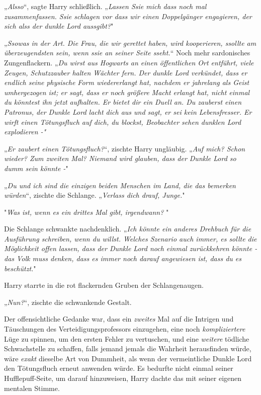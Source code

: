 {„\emph{Alsso}“, sagte Harry schließlich. „\emph{Lassen Ssie mich dass noch mal zusammenfassen. Ssie schlagen vor dass wir einen Doppelgänger engagieren, der sich alss der dunkle Lord aussgibt?}"

„\emph{Ssowas in der Art. Die Frau, die wir gerettet haben, wird kooperieren, ssollte am überzeugendsten sein, wenn ssie an seiner Seite sseht.}“ Noch mehr sardonisches Zungenflackern. „\emph{Du wirst aus Hogwarts an einen öffentlichen Ort entführt, viele Zeugen, Schutzzauber halten Wächter fern. Der dunkle Lord verkündet, dass er endlich seine physische Form wiedererlangt hat, nachdem er jahrelang als Geist umhergezogen ist; er sagt, dass er noch größere Macht erlangt hat, nicht einmal du könntest ihn jetzt aufhalten. Er bietet dir ein Duell an. Du zauberst einen Patronus, der Dunkle Lord lacht dich aus und sagt, er sei kein Lebensfresser. Er wirft einen Tötungsfluch auf dich, du blockst, Beobachter sehen dunklen Lord explodieren -"}

„\emph{Er zaubert einen Tötungsfluch?}“, zischte Harry ungläubig. „\emph{Auf mich? Schon wieder? Zum zweiten Mal? Niemand wird glauben, dass der Dunkle Lord so dumm sein könnte -}"

„\emph{Du und ich sind die einzigen beiden Menschen im Land, die das bemerken würden}“, zischte die Schlange. „\emph{Verlass dich drauf, Junge.}"

"\emph{Was ist, wenn es ein drittes Mal gibt, irgendwann?} "

Die Schlange schwankte nachdenklich. „\emph{Ich könnte ein anderes Drehbuch für die Ausführung schreiben, wenn du willst. Welches Szenario auch immer, es sollte die Möglichkeit offen lassen, dass der Dunkle Lord noch einmal zurückkehren könnte - das Volk muss denken, dass es immer noch darauf angewiesen ist, dass du es beschützt.}"

Harry starrte in die rot flackernden Gruben der Schlangenaugen.

„\emph{Nun?}“, zischte die schwankende Gestalt.

Der offensichtliche Gedanke war, dass ein \emph{zweites} Mal auf die Intrigen und Täuschungen des Verteidigungsprofessors einzugehen, eine noch \emph{kompliziertere} Lüge zu spinnen, um den ersten Fehler zu vertuschen, und eine \emph{weitere} tödliche Schwachstelle zu schaffen, falls jemand jemals die Wahrheit herausfinden würde, wäre \emph{exakt} dieselbe Art von Dummheit, als wenn der vermeintliche Dunkle Lord den Tötungsfluch erneut anwenden würde. Es bedurfte nicht einmal seiner Hufflepuff-Seite, um darauf hinzuweisen, Harry dachte das mit seiner eigenen mentalen Stimme.

}
